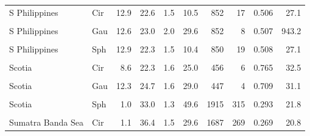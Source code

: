 \begin{ThreePartTable}
\begin{longtable}[t]{llrrrrrrrr}
S Philippines & Cir & 12.9 & 22.6 & 1.5 & 10.5 & 852 & 17 & 0.506 & 27.1\\
\cellcolor{gray!6}{S Philippines} & \cellcolor{gray!6}{Exp} & \cellcolor{gray!6}{13.2} & \cellcolor{gray!6}{21.8} & \cellcolor{gray!6}{1.5} & \cellcolor{gray!6}{10.1} & \cellcolor{gray!6}{880} & \cellcolor{gray!6}{10} & \cellcolor{gray!6}{0.509} & \cellcolor{gray!6}{26.6}\\
S Philippines & Gau & 12.6 & 23.0 & 2.0 & 29.6 & 852 & 8 & 0.507 & 943.2\\
\cellcolor{gray!6}{S Philippines} & \cellcolor{gray!6}{Lin} & \cellcolor{gray!6}{14.4} & \cellcolor{gray!6}{23.6} & \cellcolor{gray!6}{1.5} & \cellcolor{gray!6}{10.0} & \cellcolor{gray!6}{833} & \cellcolor{gray!6}{11} & \cellcolor{gray!6}{0.506} & \cellcolor{gray!6}{27.0}\\
S Philippines & Sph & 12.9 & 22.3 & 1.5 & 10.4 & 850 & 19 & 0.508 & 27.1\\
\cellcolor{gray!6}{Scotia} & \cellcolor{gray!6}{Bes} & \cellcolor{gray!6}{6.6} & \cellcolor{gray!6}{17.4} & \cellcolor{gray!6}{1.6} & \cellcolor{gray!6}{29.4} & \cellcolor{gray!6}{151} & \cellcolor{gray!6}{49} & \cellcolor{gray!6}{0.307} & \cellcolor{gray!6}{22.8}\\
Scotia & Cir & 8.6 & 22.3 & 1.6 & 25.0 & 456 & 6 & 0.765 & 32.5\\
\cellcolor{gray!6}{Scotia} & \cellcolor{gray!6}{Exp} & \cellcolor{gray!6}{19.9} & \cellcolor{gray!6}{44.7} & \cellcolor{gray!6}{1.6} & \cellcolor{gray!6}{24.5} & \cellcolor{gray!6}{747} & \cellcolor{gray!6}{12} & \cellcolor{gray!6}{0.484} & \cellcolor{gray!6}{26.0}\\
Scotia & Gau & 12.3 & 24.7 & 1.6 & 29.0 & 447 & 4 & 0.709 & 31.1\\
\cellcolor{gray!6}{Scotia} & \cellcolor{gray!6}{Lin} & \cellcolor{gray!6}{8.7} & \cellcolor{gray!6}{22.0} & \cellcolor{gray!6}{1.6} & \cellcolor{gray!6}{25.2} & \cellcolor{gray!6}{456} & \cellcolor{gray!6}{5} & \cellcolor{gray!6}{0.769} & \cellcolor{gray!6}{32.7}\\
Scotia & Sph & 1.0 & 33.0 & 1.3 & 49.6 & 1915 & 315 & 0.293 & 21.8\\
\cellcolor{gray!6}{Sumatra Banda Sea} & \cellcolor{gray!6}{Bes} & \cellcolor{gray!6}{19.6} & \cellcolor{gray!6}{48.5} & \cellcolor{gray!6}{1.5} & \cellcolor{gray!6}{30.1} & \cellcolor{gray!6}{1397} & \cellcolor{gray!6}{65} & \cellcolor{gray!6}{0.312} & \cellcolor{gray!6}{26.0}\\
Sumatra Banda Sea & Cir & 1.1 & 36.4 & 1.5 & 29.6 & 1687 & 269 & 0.269 & 20.8\\

\end{longtable}
\end{ThreePartTable}

